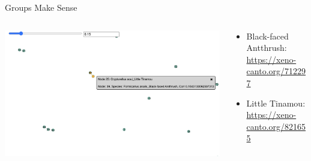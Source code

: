 \begin{frame}{Groups Make Sense}
    \begin{columns}
        \begin{column}{0.5\textwidth}
            \includegraphics[height=0.7\textheight, width=1\textwidth]{images/antthrush_tinamou.png}
        \end{column}
        \begin{column}{0.5\textwidth}
            \begin{itemize}
                \item Black-faced Antthrush: \href{https://xeno-canto.org/712297}{https://xeno-canto.org/712297}
                \item Little Tinamou: \href{https://xeno-canto.org/821655}{https://xeno-canto.org/821655}
            \end{itemize}
        \end{column}
    \end{columns}
\end{frame}


